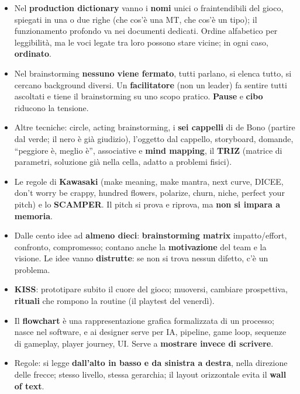 \begin{itemize}
  \item Nel \textbf{production dictionary} vanno i \textbf{nomi} unici o
        fraintendibili del gioco, spiegati in una o due righe (che cos'è una
        MT, che cos'è un tipo); il funzionamento profondo va nei documenti
        dedicati. Ordine alfabetico per leggibilità, ma le voci legate tra
        loro possono stare vicine; in ogni caso, \textbf{ordinato}.
  \item Nel brainstorming \textbf{nessuno viene fermato}, tutti parlano, si
        elenca tutto, si cercano background diversi. Un
        \textbf{facilitatore} (non un leader) fa sentire tutti ascoltati e
        tiene il brainstorming su uno scopo pratico. \textbf{Pause} e
        \textbf{cibo} riducono la tensione.
  \item Altre tecniche: circle, acting brainstorming, i \textbf{sei
        cappelli} di de Bono (partire dal verde; il nero è già giudizio),
        l'oggetto dal cappello, storyboard, domande, ``peggiore è, meglio
        è'', associative e \textbf{mind mapping}, il \textbf{TRIZ} (matrice
        di parametri, soluzione già nella cella, adatto a problemi
        fisici).
  \item Le regole di \textbf{Kawasaki} (make meaning, make mantra, next
        curve, DICEE, don't worry be crappy, hundred flowers, polarize,
        churn, niche, perfect your pitch) e lo \textbf{SCAMPER}. Il pitch si
        prova e riprova, ma \textbf{non si impara a memoria}.
  \item Dalle cento idee ad \textbf{almeno dieci}: \textbf{brainstorming
        matrix} impatto/effort, confronto, compromesso; contano anche la
        \textbf{motivazione} del team e la visione. Le idee vanno
        \textbf{distrutte}: se non si trova nessun difetto, c'è un problema.
  \item \textbf{KISS}: prototipare subito il cuore del gioco; muoversi,
        cambiare prospettiva, \textbf{rituali} che rompono la routine (il
        playtest del venerdì).
  \item Il \textbf{flowchart} è una rappresentazione grafica formalizzata di
        un processo; nasce nel software, e ai designer serve per IA,
        pipeline, game loop, sequenze di gameplay, player journey, UI.
        Serve a \textbf{mostrare invece di scrivere}.
  \item Regole: si legge \textbf{dall'alto in basso e da sinistra a
        destra}, nella direzione delle frecce; stesso livello, stessa
        gerarchia; il layout orizzontale evita il \textbf{wall of text}.

\end{itemize}
